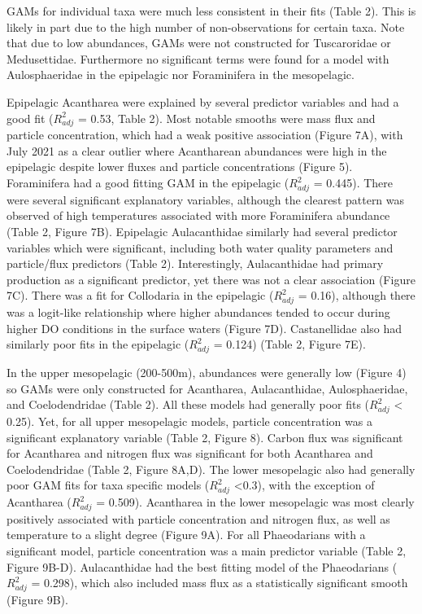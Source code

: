 \documentclass[
]{article}
\begin{document}
GAMs for individual taxa were much less consistent in their fits (Table
2). This is likely in part due to the high number of non-observations
for certain taxa. Note that due to low abundances, GAMs were not
constructed for Tuscaroridae or Medusettidae. Furthermore no significant
terms were found for a model with Aulosphaeridae in the epipelagic nor
Foraminifera in the mesopelagic.

Epipelagic Acantharea were explained by several predictor variables and
had a good fit (\(R^2_{adj}\) = 0.53, Table 2). Most notable smooths
were mass flux and particle concentration, which had a weak positive
association (Figure 7A), with July 2021 as a clear outlier where
Acantharean abundances were high in the epipelagic despite lower fluxes
and particle concentrations (Figure 5). Foraminifera had a good fitting
GAM in the epipelagic (\(R^2_{adj}\) = 0.445). There were several
significant explanatory variables, although the clearest pattern was
observed of high temperatures associated with more Foraminifera
abundance (Table 2, Figure 7B). Epipelagic Aulacanthidae similarly had
several predictor variables which were significant, including both water
quality parameters and particle/flux predictors (Table 2).
Interestingly, Aulacanthidae had primary production as a significant
predictor, yet there was not a clear association (Figure 7C). There was
a fit for Collodaria in the epipelagic (\(R^2_{adj}\) = 0.16), although
there was a logit-like relationship where higher abundances tended to
occur during higher DO conditions in the surface waters (Figure 7D).
Castanellidae also had similarly poor fits in the epipelagic
(\(R^2_{adj}\) = 0.124) (Table 2, Figure 7E).

In the upper mesopelagic (200-500m), abundances were generally low
(Figure 4) so GAMs were only constructed for Acantharea, Aulacanthidae,
Aulosphaeridae, and Coelodendridae (Table 2). All these models had
generally poor fits (\(R^2_{adj}\) \textless{} 0.25). Yet, for all upper
mesopelagic models, particle concentration was a significant explanatory
variable (Table 2, Figure 8). Carbon flux was significant for Acantharea
and nitrogen flux was significant for both Acantharea and Coelodendridae
(Table 2, Figure 8A,D). The lower mesopelagic also had generally poor
GAM fits for taxa specific models (\(R^2_{adj}\) \textless0.3), with the
exception of Acantharea (\(R^2_{adj}\) = 0.509). Acantharea in the lower
mesopelagic was most clearly positively associated with particle
concentration and nitrogen flux, as well as temperature to a slight
degree (Figure 9A). For all Phaeodarians with a significant model,
particle concentration was a main predictor variable (Table 2, Figure
9B-D). Aulacanthidae had the best fitting model of the Phaeodarians
(\(R^2_{adj}\) = 0.298), which also included mass flux as a
statistically significant smooth (Figure 9B).
\end{document}
